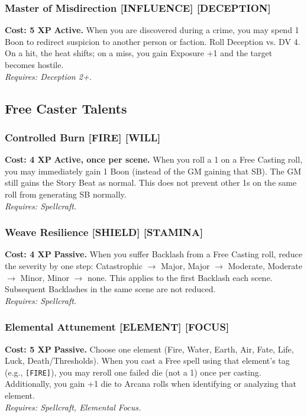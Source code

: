 \subsubsection*{Master of Misdirection \textnormal{[INFLUENCE] [DECEPTION]}}
\label{talent:master-of-misdirection}
\textbf{Cost: 5 XP} \textbf{Active.} When you are discovered during a crime, you may spend 1 Boon to redirect suspicion to another person or faction. Roll Deception vs. DV 4. On a hit, the heat shifts; on a miss, you gain Exposure +1 and the target becomes hostile. \\
\textit{Requires: Deception 2+.}

\subsection*{Free Caster Talents}
\label{sec:major-freecaster}

\subsubsection*{Controlled Burn \textnormal{[FIRE] [WILL]}}
\label{talent:controlled-burn}
\textbf{Cost: 4 XP} \textbf{Active, once per scene.} When you roll a 1 on a Free Casting roll, you may immediately gain 1 Boon (instead of the GM gaining that SB). The GM still gains the Story Beat as normal. This does not prevent other 1s on the same roll from generating SB normally. \\
\textit{Requires: Spellcraft.}

\subsubsection*{Weave Resilience \textnormal{[SHIELD] [STAMINA]}}
\label{talent:weave-resilience}
\textbf{Cost: 4 XP} \textbf{Passive.} When you suffer Backlash from a Free Casting roll, reduce the severity by one step: Catastrophic $\rightarrow$ Major, Major $\rightarrow$ Moderate, Moderate $\rightarrow$ Minor, Minor $\rightarrow$ none. This applies to the first Backlash each scene. Subsequent Backlashes in the same scene are not reduced. \\
\textit{Requires: Spellcraft.}

\subsubsection*{Elemental Attunement \textnormal{[ELEMENT] [FOCUS]}}
\label{talent:elemental-attunement}
\textbf{Cost: 5 XP} \textbf{Passive.} Choose one element (Fire, Water, Earth, Air, Fate, Life, Luck, Death/Thresholds). When you cast a Free spell using that element's tag (e.g., \texttt{[FIRE]}), you may reroll one failed die (not a 1) once per casting. Additionally, you gain +1 die to Arcana rolls when identifying or analyzing that element. \\
\textit{Requires: Spellcraft, Elemental Focus.}

